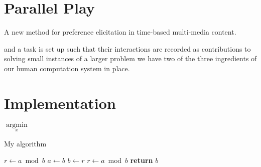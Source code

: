 \section{Parallel Play}
A new method for preference elicitation in time-based multi-media content.



and a task is set up such that their interactions are recorded as contributions to solving small instances of a larger problem we have two of the three ingredients of our human computation system in place.

\section{Implementation}
\label{sec:implementation}

$\underset{x}{\operatorname{argmin}}$

\begin{algorithm}
  \caption{My algorithm}
  \begin{algorithmic}[1]
      \State $r\gets a\bmod b$
        \State $a\gets b$
        \State $b\gets r$
        \State $r\gets a\bmod b$
      \EndWhile\label{euclidendwhile}
      \State \textbf{return} $b$
    \EndProcedure

  \end{algorithmic}
\end{algorithm}

% 
% 

